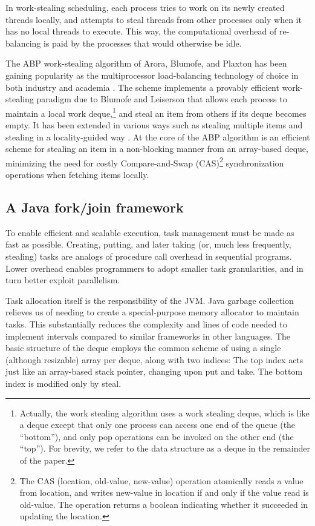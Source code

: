 In work-stealing scheduling, each process tries to work on its newly
created threads locally, and attempts to steal threads from other
processes only when it has no local threads to execute. This way, the
computational overhead of re-balancing is paid by the processes that
would otherwise be idle.

The ABP work-stealing algorithm of Arora, Blumofe, and Plaxton
\cite{Arora2001} has been gaining popularity as the multiprocessor
load-balancing technology of choice in both industry and academia
\cite{Arora2001, Acar2002, Blumofe1995, Frigo1998, Danaher2005}. The
scheme implements a provably efficient work-stealing paradigm due to
Blumofe and Leiserson \cite{Blumofe1999} that allows each process to
maintain a local work deque,\footnote{Actually, the work stealing
  algorithm uses a work stealing deque, which is like a deque
  \cite{Knuth1997} except that only one process can access one end of
  the queue (the ``bottom''), and only pop operations can be invoked
  on the other end (the ``top''). For brevity, we refer to the data
  structure as a deque in the remainder of the paper.} and steal an
item from others if its deque becomes empty. It has been extended in
various ways such as stealing multiple items \cite{Hendler2002} and
stealing in a locality-guided way \cite{Acar2002}. At the core of the
ABP algorithm is an efficient scheme for stealing an item in a
non-blocking manner from an array-based deque, minimizing the need for
costly Compare-and-Swap (CAS)\footnote{The CAS (location, old-value,
  new-value) operation atomically reads a value from location, and
  writes new-value in location if and only if the value read is
  old-value. The operation returns a boolean indicating whether it
  succeeded in updating the location.} synchronization operations when
fetching items locally.

\subsection{A Java fork/join framework \cite{Lea2000}}

To enable efficient and scalable execution, task management must be
made as fast as possible. Creating, putting, and later taking (or,
much less frequently, stealing) tasks are analogs of procedure call
overhead in sequential programs. Lower overhead enables programmers to
adopt smaller task granularities, and in turn better exploit
parallelism.

Task allocation itself is the responsibility of the JVM. Java garbage
collection relieves us of needing to create a special-purpose memory
allocator to maintain tasks. This substantially reduces the complexity
and lines of code needed to implement intervals compared to similar
frameworks in other languages. The basic structure of the deque
employs the common scheme of using a single (although resizable) array
per deque, along with two indices: The top index acts just like an
array-based stack pointer, changing upon put and take. The bottom
index is modified only by steal.

